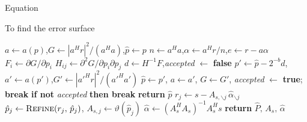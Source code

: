 Equation 

To find the error surface 

\begin{algorithm}[ht]
\caption{Off-grid refinement}\label{algo:refine}
\begin{algorithmic}[1]
\State $a \gets a(p)$,\quad $G \gets |a^{H}r|^{2}/(a^{H}a)$,\quad $\hat{p} \gets p$
  \State $n \gets a^{H}a$,\quad $\alpha \gets a^{H}r/n$,\quad $e \gets r - a\alpha$
  \State $F_{i} \gets \partial G / \partial p_{i}$ 
  \State $H_{ij} \gets \partial^{2} G / \partial p_{i} \partial p_{j}$
  \State $d \gets H^{-1}F$,\quad \textit{accepted} $\gets$ \textbf{false}
    \State $p' \gets \hat{p} - 2^{-b}d$,\quad
           $a' \gets a(p')$,\quad $G' \gets |a'^{H}r|^{2}/(a'^{H}a')$
      \State $\hat{p} \gets p'$,\; $a \gets a'$,\; $G \gets G'$,\;
             \textit{accepted} $\gets$ \textbf{true};\; \textbf{break}
    \EndIf
  \EndFor
  \State \textbf{if not} \textit{accepted} \textbf{then break}
\EndFor
\State \textbf{return} $\hat{p}$
\EndProcedure
\Statex
{}
    \State $r_j \gets s - A_{s,\backslash j}\,\hat{\alpha}_{\backslash j}$
    \State $\hat{p}_j \gets \textsc{Refine}(r_j,\, \hat{p}_j)$,\quad
           $A_{s,j} \gets \vartheta(\hat{p}_j)$
  \EndFor
  \State $\hat{\alpha} \gets (A_s^{H}A_s)^{-1}A_s^{H}s$
\EndFor
\State \textbf{return} $\hat{P},\, A_s,\, \hat{\alpha}$
\EndProcedure
\end{algorithmic}
\end{algorithm}
 



